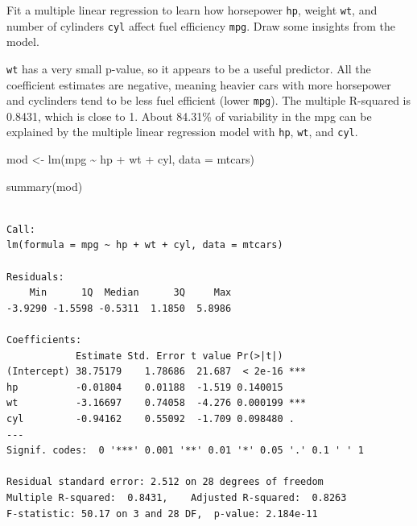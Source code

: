 \documentclass[
  letterpaper,
  DIV=11,
  numbers=noendperiod]{scrreprt}
\newenvironment{Shaded}{\begin{snugshade}}{\end{snugshade}}
\newcommand{\AttributeTok}[1]{\textcolor[rgb]{0.40,0.45,0.13}{#1}}
\newcommand{\FunctionTok}[1]{\textcolor[rgb]{0.28,0.35,0.67}{#1}}
\newcommand{\NormalTok}[1]{\textcolor[rgb]{0.00,0.23,0.31}{#1}}
\newcommand{\OtherTok}[1]{\textcolor[rgb]{0.00,0.23,0.31}{#1}}
\newcommand{\SpecialCharTok}[1]{\textcolor[rgb]{0.37,0.37,0.37}{#1}}
\begin{document}
Fit a multiple linear regression to learn how horsepower \texttt{hp},
weight \texttt{wt}, and number of cylinders \texttt{cyl} affect fuel
efficiency \texttt{mpg}. Draw some insights from the model.

\begin{tcolorbox}[enhanced jigsaw, colbacktitle=quarto-callout-tip-color!10!white, opacitybacktitle=0.6, breakable, left=2mm, leftrule=.75mm, toprule=.15mm, toptitle=1mm, bottomtitle=1mm, colframe=quarto-callout-tip-color-frame, opacityback=0, coltitle=black, arc=.35mm, titlerule=0mm, colback=white, bottomrule=.15mm, title=\textcolor{quarto-callout-tip-color}{\faLightbulb}\hspace{0.5em}{Answer}, rightrule=.15mm]

\texttt{wt} has a very small p-value, so it appears to be a useful
predictor. All the coefficient estimates are negative, meaning heavier
cars with more horsepower and cyclinders tend to be less fuel efficient
(lower \texttt{mpg}). The multiple R-squared is 0.8431, which is close
to 1. About 84.31\% of variability in the mpg can be explained by the
multiple linear regression model with \texttt{hp}, \texttt{wt}, and
\texttt{cyl}.

\begin{Shaded}
\begin{Highlighting}[]
\NormalTok{mod }\OtherTok{\textless{}{-}} \FunctionTok{lm}\NormalTok{(mpg }\SpecialCharTok{\textasciitilde{}}\NormalTok{ hp }\SpecialCharTok{+}\NormalTok{ wt }\SpecialCharTok{+}\NormalTok{ cyl, }\AttributeTok{data =}\NormalTok{ mtcars)}

\FunctionTok{summary}\NormalTok{(mod)}
\end{Highlighting}
\end{Shaded}

\begin{verbatim}

Call:
lm(formula = mpg ~ hp + wt + cyl, data = mtcars)

Residuals:
    Min      1Q  Median      3Q     Max 
-3.9290 -1.5598 -0.5311  1.1850  5.8986 

Coefficients:
            Estimate Std. Error t value Pr(>|t|)    
(Intercept) 38.75179    1.78686  21.687  < 2e-16 ***
hp          -0.01804    0.01188  -1.519 0.140015    
wt          -3.16697    0.74058  -4.276 0.000199 ***
cyl         -0.94162    0.55092  -1.709 0.098480 .  
---
Signif. codes:  0 '***' 0.001 '**' 0.01 '*' 0.05 '.' 0.1 ' ' 1

Residual standard error: 2.512 on 28 degrees of freedom
Multiple R-squared:  0.8431,    Adjusted R-squared:  0.8263 
F-statistic: 50.17 on 3 and 28 DF,  p-value: 2.184e-11
\end{verbatim}

\end{tcolorbox}
\end{document}
